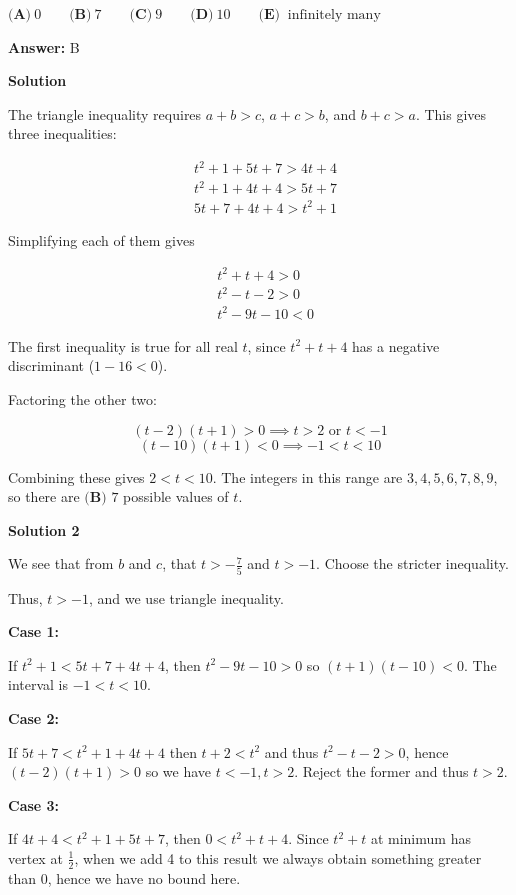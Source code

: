 \begin{enumerate}
 $\textbf{(A)} ~0 \qquad \textbf{(B)} ~7 \qquad \textbf{(C)} ~9 \qquad \textbf{(D)} ~10 \qquad \textbf{(E)} ~\text{ infinitely many}$

 \textbf{Answer: }B



\textbf{Solution}

The triangle inequality requires $a+b>c$, $a+c>b$, and $b+c>a$. This gives three inequalities:

 
 \begin{align*} &t^2+1+5t+7>4t+4 \\ &t^2+1+4t+4>5t+7 \\ &5t+7+4t+4>t^2+1 \end{align*}


 Simplifying each of them gives

 
 \begin{align*} &t^2+t+4>0 \\ &t^2-t-2>0 \\ &t^2-9t-10<0 \end{align*}


 The first inequality is true for all real $t$, since $t^2+t+4$ has a negative discriminant ($1-16<0$).

 Factoring the other two:

 
 \[(t-2)(t+1)>0 \implies t>2 \text{ or } t<-1\]
 \[(t-10)(t+1)<0 \implies -1<t<10\]

 Combining these gives $2<t<10$. The integers in this range are $3,4,5,6,7,8,9$, so there are $\boxed{\textbf{(B) }7}$ possible values of $t$.

 



\textbf{Solution 2}

We see that from $b$ and $c$, that $t > -\frac{7}{5}$ and $t > -1$. Choose the stricter inequality.

 Thus, $t > -1$, and we use triangle inequality.

 \textbf{Case 1:}

 If $t^2 + 1 < 5t+7 + 4t+4$, then $t^2 - 9t - 10 > 0$ so $(t+1)(t-10) < 0$. The interval is $-1 < t < 10$.

 \textbf{Case 2:}

 If $5t+7 < t^2 + 1 + 4t + 4$ then $t + 2 < t^2$ and thus $t^2 - t - 2 > 0$, hence $(t-2)(t+1) > 0$ so we have $t < -1, t > 2$. Reject the former and thus $t > 2$.

 \textbf{Case 3:}

 If $4t+4 < t^2 + 1 + 5t + 7$, then $0 < t^2+t +4$. Since $t^2 + t$ at minimum has vertex at $\frac{1}{2}$, when we add 4 to this result we always obtain something greater than 0, hence we have no bound here.


\end{enumerate}
